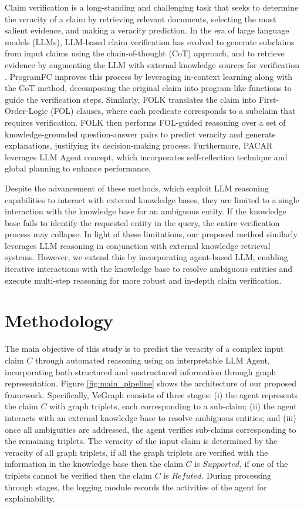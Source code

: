 \documentclass[11pt]{article}
\begin{document}
Claim verification is a long-standing and challenging task that seeks to determine the veracity of a claim by retrieving relevant documents, selecting the most salient evidence, and making a veracity prediction. In the era of large language models (LLMs), LLM-based claim verification has evolved to generate subclaims from input claims using the chain-of-thought (CoT) approach, and to retrieve evidence by augmenting the LLM with external knowledge sources for verification \cite{fact_check_survey}. ProgramFC \cite{program_fc} improves this process by leveraging in-context learning along with the CoT method, decomposing the original claim into program-like functions to guide the verification steps. Similarly, FOLK \cite{WangS23a} translates the claim into First-Order-Logic (FOL) clauses, where each predicate corresponds to a subclaim that requires verification. FOLK then performs FOL-guided reasoning over a set of knowledge-grounded question-answer pairs to predict veracity and generate explanations, justifying its decision-making process. Furthermore, PACAR \cite{ZhaoWWCZW24} leverages LLM Agent concept, which incorporates self-reflection technique and global planning to enhance performance. 

Despite the advancement of these methods, which exploit LLM reasoning capabilities to interact with external knowledge bases, they are limited to a single interaction with the knowledge base for an ambiguous entity. If the knowledge base fails to identify the requested entity in the query, the entire verification process may collapse. In light of these limitations, our proposed method similarly leverages LLM reasoning in conjunction with external knowledge retrieval systems. However, we extend this by incorporating agent-based LLM, enabling iterative interactions with the knowledge base to resolve ambiguous entities and execute multi-step reasoning for more robust and in-depth claim verification.
 
\section{Methodology}
The main objective of this study is to predict the veracity of a complex input claim $C$ through automated reasoning using an interpretable LLM Agent, incorporating both structured and unstructured information through graph representation. Figure \ref{fig:main_pipeline} shows the architecture of our proposed framework. Specifically, VeGraph consists of three stages: (i) the agent represents the claim $C$ with graph triplets, each corresponding to a sub-claim; (ii) the agent interacts with an external knowledge base to resolve ambiguous entities; and (iii) once all ambiguities are addressed, the agent verifies sub-claims corresponding to the remaining triplets. The veracity of the input claim is determined by the veracity of all graph triplets, if all the graph triplets are verified with the information in the knowledge base then the claim $C$ is $Supported$, if one of the triplets cannot be verified then the claim $C$ is $Refuted$. During processing through stages, the logging module records the activities of the agent for explainability.
\end{document}
